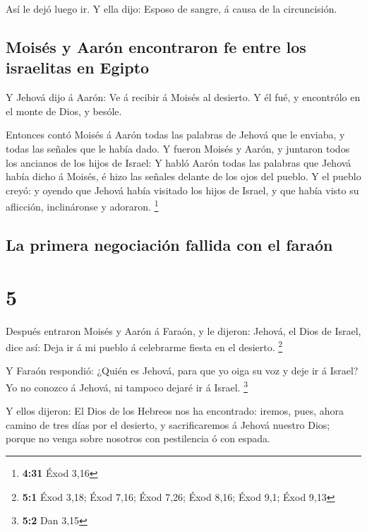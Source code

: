  Así le dejó luego ir. Y ella dijo: Esposo de sangre, á
causa de la circuncisión.

\hypertarget{moisuxe9s-y-aaruxf3n-encontraron-fe-entre-los-israelitas-en-egipto}{%
\subsection{Moisés y Aarón encontraron fe entre los israelitas en
Egipto}\label{moisuxe9s-y-aaruxf3n-encontraron-fe-entre-los-israelitas-en-egipto}}

 Y Jehová dijo á Aarón: Ve á recibir á Moisés al desierto.
Y él fué, y encontrólo en el monte de Dios, y besóle.

 Entonces contó Moisés á Aarón todas las palabras de Jehová
que le enviaba, y todas las señales que le había dado.  Y
fueron Moisés y Aarón, y juntaron todos los ancianos de los hijos de
Israel:  Y habló Aarón todas las palabras que Jehová había
dicho á Moisés, é hizo las señales delante de los ojos del pueblo.
 Y el pueblo creyó: y oyendo que Jehová había visitado los
hijos de Israel, y que había visto su aflicción, inclináronse y
adoraron. \footnote{\textbf{4:31} Éxod 3,16}

\hypertarget{la-primera-negociaciuxf3n-fallida-con-el-farauxf3n}{%
\subsection{La primera negociación fallida con el
faraón}\label{la-primera-negociaciuxf3n-fallida-con-el-farauxf3n}}

\hypertarget{section-4}{%
\section{5}\label{section-4}}

 Después entraron Moisés y Aarón á Faraón, y le dijeron:
Jehová, el Dios de Israel, dice así: Deja ir á mi pueblo á celebrarme
fiesta en el desierto. \footnote{\textbf{5:1} Éxod 3,18; Éxod 7,16; Éxod
  7,26; Éxod 8,16; Éxod 9,1; Éxod 9,13}

 Y Faraón respondió: ¿Quién es Jehová, para que yo oiga su
voz y deje ir á Israel? Yo no conozco á Jehová, ni tampoco dejaré ir á
Israel. \footnote{\textbf{5:2} Dan 3,15}

 Y ellos dijeron: El Dios de los Hebreos nos ha encontrado:
iremos, pues, ahora camino de tres días por el desierto, y
sacrificaremos á Jehová nuestro Dios; porque no venga sobre nosotros con
pestilencia ó con espada.

